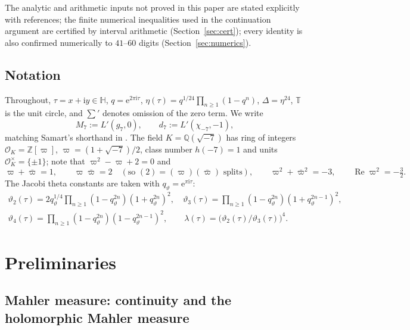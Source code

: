 \documentclass[11pt]{article}
\theoremstyle{definition}
\theoremstyle{remark}
\newcommand{\Hh}{\mathbb{H}}
\newcommand{\Qq}{\mathbb{Q}}
\newcommand{\Zz}{\mathbb{Z}}
\newcommand{\Tt}{\mathbb{T}}
\newcommand{\ii}{\mathrm{i}}
\newcommand{\e}{\mathrm{e}}
\newcommand{\ReT}{\operatorname{Re}}
\newcommand{\OO}{\mathcal{O}}
\begin{document}
The analytic and arithmetic inputs not proved in this paper are stated
explicitly with references; the finite numerical inequalities used in
the continuation argument are certified by interval arithmetic
(Section~\ref{sec:cert}); every identity
is also confirmed numerically to $41$--$60$ digits
(Section~\ref{sec:numerics}).

\subsection{Notation}

Throughout, $\tau=x+\ii y\in\Hh$, $q=\e^{2\pi \ii\tau}$,
$\eta(\tau)=q^{1/24}\prod_{n\ge1}(1-q^n)$, $\Delta=\eta^{24}$, $\Tt$ is
the unit circle, and $\sum'$ denotes omission of the zero term. We write
\[
  M_7:=L'(g_7,0),\qquad d_7:=L'(\chi_{-7},-1),
\]
matching Samart's shorthand in \cite{Sa15}. The field
$K=\Qq(\sqrt{-7})$ has ring of integers $\OO_K=\Zz[\varpi]$,
$\varpi=(1+\sqrt{-7})/2$, class number $h(-7)=1$ and units
$\OO_K^\times=\{\pm1\}$; note that $\varpi^2-\varpi+2=0$ and
\begin{equation}\label{eq:pirels}
  \varpi+\bar\varpi=1,\qquad \varpi\bar\varpi=2\quad(\text{so }
  (2)=(\varpi)(\bar\varpi)
  \text{ splits}),\qquad \varpi^2+\bar\varpi^2=-3,\qquad
  \ReT\varpi^2=-\tfrac32 .
\end{equation}
The Jacobi theta constants are taken with
$q_\vartheta=\e^{\pi \ii\tau}$:
\begin{gather*}
\vartheta_2(\tau)=2q_\vartheta^{1/4}\prod_{n\ge1}(1-q_\vartheta^{2n})(1+q_\vartheta^{2n})^2,\quad
\vartheta_3(\tau)=\prod_{n\ge1}(1-q_\vartheta^{2n})(1+q_\vartheta^{2n-1})^2,\\
\vartheta_4(\tau)=\prod_{n\ge1}(1-q_\vartheta^{2n})(1-q_\vartheta^{2n-1})^2,
\qquad
\lambda(\tau)=\bigl(\vartheta_2(\tau)/\vartheta_3(\tau)\bigr)^4 .
\end{gather*}

\section{Preliminaries}\label{sec:prelim}

\subsection{Mahler measure: continuity and the holomorphic Mahler measure}\label{subsec:mahler}
\end{document}
